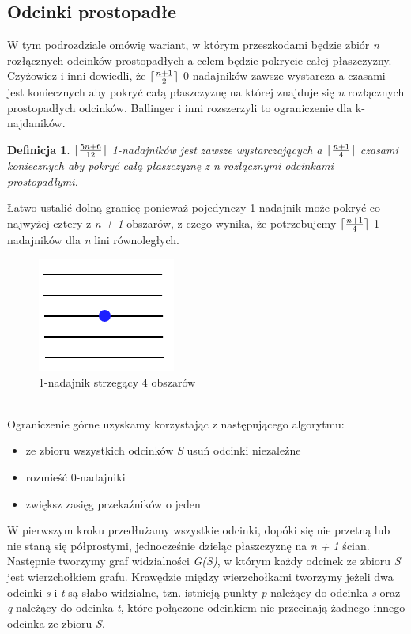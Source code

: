 \documentclass[brudnopis]{xmgr}
\DeclarePairedDelimiter\ceil{\lceil}{\rceil}
\newtheorem{Definicja}{Definicja}
\begin{document}
\subsection{Odcinki prostopadłe}
W tym podrozdziale omówię wariant, w którym przeszkodami będzie zbiór \textit{n} rozłącznych odcinków prostopadłych a celem będzie pokrycie całej płaszczyzny. Czyżowicz i inni dowiedli, że $\ceil{\frac{n+1}{2}}$ 0-nadajników zawsze wystarcza a czasami jest koniecznych aby pokryć całą płaszczyznę na której znajduje się \textit{n} rozłącznych prostopadłych odcinków. Ballinger i inni rozszerzyli to ograniczenie dla k-najdaników.
\begin{Definicja} \label{ograniczenie zbiór odcinków prostopadłych}
  $\ceil{\frac{5n+6}{12}}$ 1-nadajników jest zawsze wystarczających a $\ceil{\frac{n+1}{4}}$ czasami koniecznych aby pokryć całą płaszczyznę z n rozłącznymi odcinkami prostopadłymi.
\end{Definicja}
\indent Łatwo ustalić dolną granicę ponieważ pojedynczy 1-nadajnik może pokryć co najwyżej cztery z \textit{n + 1} obszarów, z czego wynika, że potrzebujemy $\ceil{\frac{n+1}{4}}$ 1-nadajników dla \textit{n} lini równoległych.
\begin{figure}[ht!]
  \centering
  \includegraphics{rysunki/k_nadajniki_ogr_dolne.png}
  \caption{1-nadajnik strzegący 4 obszarów}
  \label{fig:ogr_dolne}
\end{figure} 
\\\indent Ograniczenie górne uzyskamy korzystając z następującego algorytmu:
\begin{itemize}
  \item ze zbioru wszystkich odcinków \textit{S} usuń odcinki niezależne
  \item rozmieść 0-nadajniki
  \item zwiększ zasięg przekaźników o jeden
\end{itemize}

W pierwszym kroku przedłużamy wszystkie odcinki, dopóki się nie przetną lub nie staną się półprostymi, jednocześnie dzieląc płaszczyznę na \textit{n + 1} ścian. Następnie tworzymy graf widzialności \textit{G(S)}, w którym każdy odcinek ze zbioru \textit{S} jest wierzchołkiem grafu. Krawędzie między wierzchołkami tworzymy jeżeli dwa odcinki \textit{s} i \textit{t} są słabo widzialne, tzn. istnieją punkty \textit{p} należący do odcinka \textit{s} oraz \textit{q} należący do odcinka \textit{t}, które połączone odcinkiem nie przecinają żadnego innego odcinka ze zbioru \textit{S}.
\end{document}
